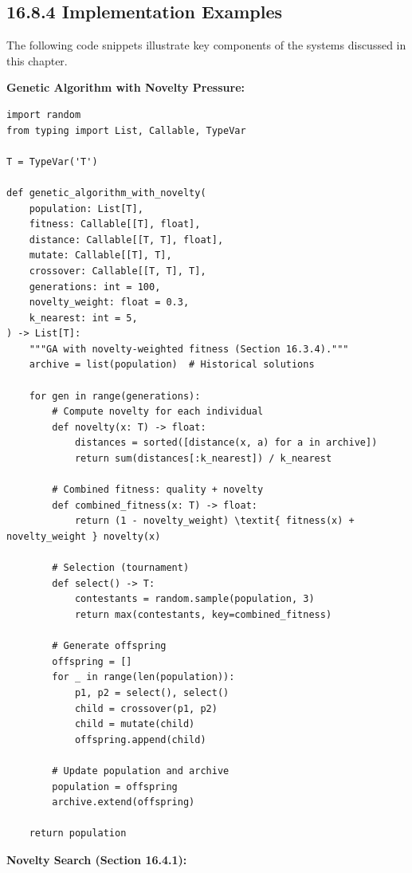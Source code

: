 \subsection{16.8.4 Implementation Examples}

The following code snippets illustrate key components of the systems discussed in this chapter.

\textbf{Genetic Algorithm with Novelty Pressure:}

\begin{verbatim}
import random
from typing import List, Callable, TypeVar

T = TypeVar('T')

def genetic_algorithm_with_novelty(
    population: List[T],
    fitness: Callable[[T], float],
    distance: Callable[[T, T], float],
    mutate: Callable[[T], T],
    crossover: Callable[[T, T], T],
    generations: int = 100,
    novelty_weight: float = 0.3,
    k_nearest: int = 5,
) -> List[T]:
    """GA with novelty-weighted fitness (Section 16.3.4)."""
    archive = list(population)  # Historical solutions

    for gen in range(generations):
        # Compute novelty for each individual
        def novelty(x: T) -> float:
            distances = sorted([distance(x, a) for a in archive])
            return sum(distances[:k_nearest]) / k_nearest

        # Combined fitness: quality + novelty
        def combined_fitness(x: T) -> float:
            return (1 - novelty_weight) \textit{ fitness(x) + novelty_weight } novelty(x)

        # Selection (tournament)
        def select() -> T:
            contestants = random.sample(population, 3)
            return max(contestants, key=combined_fitness)

        # Generate offspring
        offspring = []
        for _ in range(len(population)):
            p1, p2 = select(), select()
            child = crossover(p1, p2)
            child = mutate(child)
            offspring.append(child)

        # Update population and archive
        population = offspring
        archive.extend(offspring)

    return population
\end{verbatim}

\textbf{Novelty Search (Section 16.4.1):}

